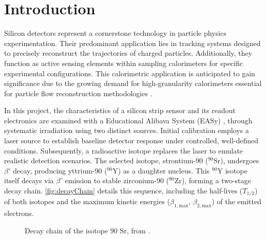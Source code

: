 
\chapter*{Introduction}

Silicon detectors represent a cornerstone technology in particle physics experimentation. Their predominant application lies in tracking systems designed to precisely reconstruct the trajectories of charged particles. Additionally, they function as active sensing elements within sampling calorimeters for specific experimental configurations. This calorimetric application is anticipated to gain significance due to the growing demand for high-granularity calorimeters essential for particle flow reconstruction methodologies \cite{krammer2015silicon}.

In this project, the characteristics of a silicon strip sensor and its readout electronics are examined with a Educational Alibava System (EASy) \cite{EASY}, through systematic irradiation using two distinct sources.
Initial calibration employs a laser source to establish baseline detector response under controlled, well-defined conditions. Subsequently, a radioactive isotope replaces the laser to emulate realistic detection scenarios. The selected isotope, strontium-90 ($^{90}\mathrm{Sr}$), undergoes $\beta⁻$ decay, producing yttrium-90 ($^{90}\mathrm{Y}$) as a daughter nucleus. This $^{90}\mathrm{Y}$ isotope itself decays via $\beta⁻$ emission to stable zirconium-90 ($^{90}\mathrm{Zr}$), forming a two-stage decay chain. \autoref{fig:decayChain} details this sequence, including the half-lives ($T_{1/2}$) of both isotopes and the maximum kinetic energies ($\beta_{1,\mathrm{max}}$, $\beta_{2,\mathrm{max}}$) of the emitted electrons.

\begin{figure}[H]
	\centering
	\caption{Decay chain of the isotope 90 Sr, from \cite{attrep2008determination}.}
	\label{fig:decayChain}
\end{figure}

